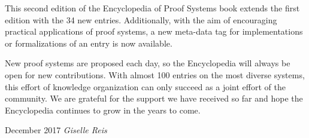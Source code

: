 This second edition of the Encyclopedia of Proof Systems book extends the first
edition with the 34 new entries.
%
Additionally, with the aim of encouraging practical applications of proof systems, a new meta-data tag for implementations or formalizations of an entry
is now available.

New proof systems are proposed each day, so the Encyclopedia will always be open
for new contributions. 
%
With almost 100 entries on the most diverse systems, this effort of knowledge
organization can only succeed as a joint effort of the community.
%
We are grateful for the support we have received so far and hope the
Encyclopedia continues to grow in the years to come.

\vspace{\baselineskip}
\begin{flushright}\noindent
December 2017 \hfill {\it Giselle Reis}
\end{flushright}


